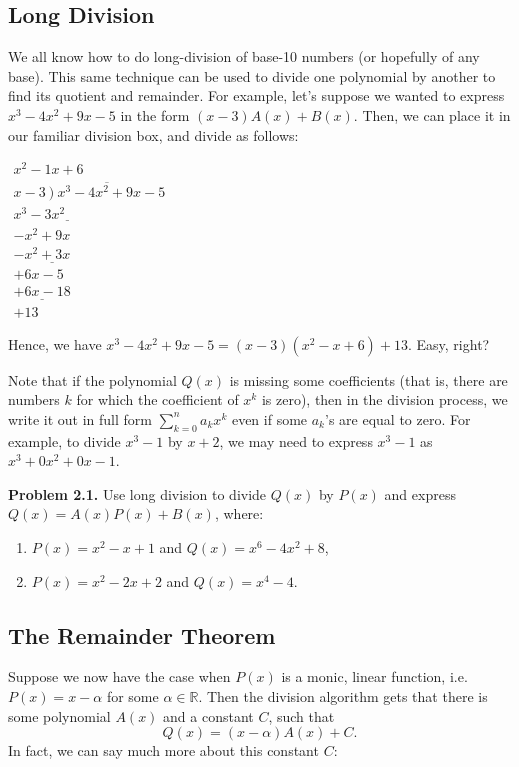 \documentclass[12pt]{article}
\begin{document}
\subsection{Long Division}
We all know how to do long-division of base-10 numbers (or hopefully of any base). This same technique can be used to divide one polynomial by another to find its quotient and remainder. For example, let's suppose we wanted to express $x^3-4x^2+9x-5$ in the form $(x-3)A(x)+B(x)$. Then, we can place it in our familiar division box, and divide as follows:
\begin{center}
	${\displaystyle {\begin{array}{r}x^{2}-1x+6\\x-3\ {\overline {)\ x^{3}-4x^{2}+9x-5}}\\{\underline {x^{3}-3x^{2}\quad \quad \quad \quad}}\\-x^{2}+9x\quad\ \ \\{\underline {-x^{2}+3x\quad\ \ }}\\+6x-5\\{\underline {+6x-18}}\\+13\end{array}}}$
\end{center}
Hence, we have $x^3-4x^2+9x-5=(x-3)(x^2-x+6)+13$. Easy, right?

\vspace{2mm}

\noindent Note that if the polynomial $Q(x)$ is missing some coefficients (that is, there are numbers $k$ for which the coefficient of $x^k$ is zero), then in the division process, we write it out in full form $\sum^n_{k=0}a_kx^k$ even if some $a_k$'s are equal to zero. For example, to divide $x^3-1$ by $x+2$, we may need to express $x^3-1$ as $x^3+0x^2+0x-1$.

\vspace{4mm}

\noindent \textbf{Problem 2.1.} Use long division to divide $Q(x)$ by $P(x)$ and express $Q(x)=A(x)P(x)+B(x)$, where:
\begin{enumerate}
	\item $P(x)=x^2-x+1$ and $Q(x)=x^6-4x^2+8$,
	\item $P(x)=x^2-2x+2$ and $Q(x)=x^4-4$.
\end{enumerate}
\subsection{The Remainder Theorem}
Suppose we now have the case when $P(x)$ is a monic, linear function, i.e. $P(x)=x-\alpha$ for some $\alpha\in \mathbb{R}$. Then the division algorithm gets that there is some polynomial $A(x)$ and a constant $C$, such that \[Q(x)=(x-\alpha)A(x)+C.\] In fact, we can say much more about this constant $C$: 
\end{document}
